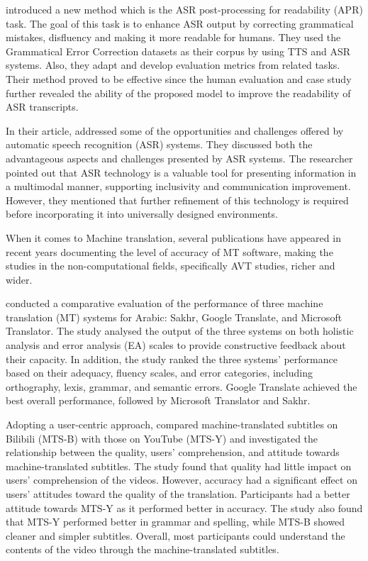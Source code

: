 \documentclass[english]{textolivre}
\begin{document}
\textcite{liao_improving_2023} introduced a new
method which is the ASR post-processing for readability (APR) task. The
goal of this task is to enhance ASR output by correcting grammatical
mistakes, disfluency and making it more readable for humans. They used
the Grammatical Error Correction datasets as their corpus by using TTS
and ASR systems. Also, they adapt and develop evaluation metrics from
related tasks. Their method proved to be effective since the human
evaluation and case study further revealed the ability of the proposed
model to improve the readability of ASR transcripts.

In their article, \textcite{pucci_towards_2023} addressed some
of the opportunities and challenges offered by automatic speech
recognition (ASR) systems. They discussed both the advantageous aspects
and challenges presented by ASR systems. The researcher pointed out that
ASR technology is a valuable tool for presenting information in a
multimodal manner, supporting inclusivity and communication improvement.
However, they mentioned that further refinement of this technology is
required before incorporating it into universally designed environments.

When it comes to Machine translation, several publications have appeared
in recent years documenting the level of accuracy of MT software, making
the studies in the non-computational fields, specifically AVT studies,
richer and wider.

\textcite{al_mahasees_analysing_2021} conducted a comparative
evaluation of the performance of three machine translation (MT) systems
for Arabic: Sakhr, Google Translate, and Microsoft Translator. The study
analysed the output of the three systems on both holistic analysis and
error analysis (EA) scales to provide constructive feedback about their
capacity. In addition, the study ranked the three systems' performance
based on their adequacy, fluency scales, and error categories, including
orthography, lexis, grammar, and semantic errors. Google Translate
achieved the best overall performance, followed by Microsoft Translator
and Sakhr.

Adopting a user-centric approach, \textcite{xie_comparative_2022}
compared machine-translated subtitles on Bilibili (MTS-B) with those on
YouTube (MTS-Y) and investigated the relationship between the quality,
users' comprehension, and attitude towards machine-translated subtitles.
The study found that quality had little impact on users' comprehension
of the videos. However, accuracy had a significant effect on users'
attitudes toward the quality of the translation. Participants had a
better attitude towards MTS-Y as it performed better in accuracy. The
study also found that MTS-Y performed better in grammar and spelling,
while MTS-B showed cleaner and simpler subtitles. Overall, most
participants could understand the contents of the video through the
machine-translated subtitles.
\end{document}
